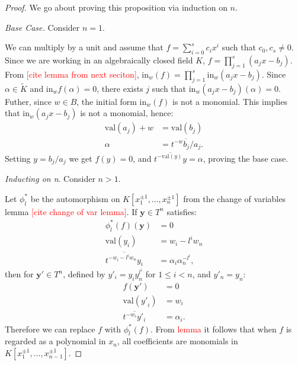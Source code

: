     \begin{proof}
        We go about proving this proposition via induction on $n$.
        \par \textit{Base Case.} Consider $n = 1$.
        \par We can multiply by a unit and assume that $f = \sum_{i=0}^{s}c_{i}x^{i}$ such that $c_{0}, c_{s}\neq0$. 
        Since we are working in an algebraically closed field $K$, $f = \prod^{s}_{j=1} (a_{j}x-b_{j})$. 
        From \textcolor{red}{[cite lemma from next seciton]}, $\text{in}_{w}(f) = \prod^{s}_{j=1} \text{in}_{w}(a_{j}x-b_{j})$. 
        Since $\alpha \in \tilde{K}$ and $\text{in}_{w}f(\alpha)=0$, there exists $j$ such that $\text{in}_{w}(a_{j}x-b_{j})(\alpha) = 0$.
        Futher, since $w \in B$, the initial form $\text{in}_{w}(f)$ is not a monomial.
        This implies that $\text{in}_{w}(a_{j}x-b_{j})$ is not a monomial, hence:
        \begin{align*}
            \text{val}(a_{j}) + w &= \text{val}(b_{j})\\
            \alpha &= \overline{t^{-w}b_{j}/a_{j}}.
        \end{align*}
        Setting $y = b_{j}/a_{j}$ we get $f(y) = 0$, and $\overline{t^{-\text{val}(y)}y} = \alpha$, proving the base case.
        \par \textit{Inducting on n}. Consider $n>1$.       
        \par Let $\phi^{*}_{l}$ be the automorphism on $ K[x_{1}^{\pm1}, \dots, x_{n}^{\pm1}]$ from the change of variables lemma \textcolor{red}{[cite change of var lemma]}.
        If $\textbf{y}\in T^{n}$ satisfies:
        \begin{align*}
            \phi^{*}_{l}(f)(\textbf{y}) &= 0\\
            \text{val}({y}_{i}) &= w_{i} - l^{i}w_{n} \\
            \overline{t^{-w_{i}- l^{i}w_{n}}y_{i}} &= \alpha_{i}\alpha_{n}^{-l^{i}},
        \end{align*}
        then for  $\textbf{y}'\in T^{n}$, defined by $y'_{i}=y_{i}y_{n}^{l^{i}}$ for $1\leq i<n$, and $y'_{n}  = y_{n}$:
        \begin{align*}
            f(\textbf{y}') &= 0\\
            \text{val}({y'}_{i}) &= w_{i} \\
            \overline{t^{-w_{i}}y'_{i}} &= \alpha_{i}.
        \end{align*}
        Therefore we can replace $f$ with $\phi^{*}_{l}(f)$.
        From \textcolor{red}{lemma} it follows that when $f$ is regarded as a polynomial in $x_{n}$, all coefficients are monomials in $ K[x_{1}^{\pm1}, \dots, x_{n-1}^{\pm1}]$.

\end{proof}
